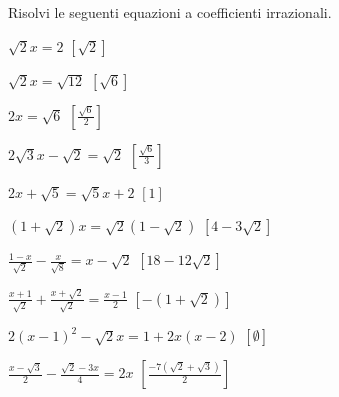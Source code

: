 \begin{esercizio}[\Ast]
 \label{ese:2.80}
Risolvi le seguenti equazioni a coefficienti irrazionali.
 \begin{multicols}{2}
 \begin{enumeratea}
 \item $\sqrt 2x=2$
  \hfill $\left[\sqrt 2 \right]$
 \item $\sqrt 2x=\sqrt{12}$
  \hfill $\left[\sqrt 6\right]$
 \item $2x=\sqrt 6$
  \hfill $\left[\frac{\sqrt{6}}{2}\right]$
 \item $2\sqrt 3x-\sqrt 2=\sqrt 2$
  \hfill $\left[\frac{\sqrt 6} 3\right]$
 \item $2x+\sqrt 5=\sqrt 5x+2$
  \hfill $\left[1\right]$
 \item $(1+\sqrt 2)x=\sqrt 2(1-\sqrt 2)$
  \hfill $\left[4-3\sqrt 2\right]$
 \item $\frac{1-x}{\sqrt 2}-\frac x{\sqrt 8}=x-\sqrt 2$
  \hfill $\left[18-12\sqrt 2\right]$
 \item $\frac{x+1}{\sqrt 2}+\frac{x+\sqrt 2}{\sqrt 2}=\frac{x-1} 2$
  \hfill $\left[-(1+\sqrt 2)\right]$
 \item $2(x-1)^2-\sqrt 2x=1+2x(x-2)$
  \hfill $\left[\emptyset\right]$
 \item $\frac{x-\sqrt 3} 2-\frac{\sqrt 2-3x} 4=2x$
  \hfill $\left[\frac{-7(\sqrt 2+\sqrt 3)} 2\right]$
 \end{enumeratea}
 \end{multicols}
\end{esercizio}



